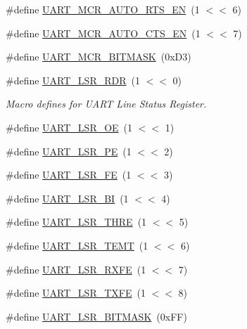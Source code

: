 \begin{DoxyCompactItemize}
\item 
\#define \hyperlink{group__UART__17XX__40XX_gae26cd92b527d6d6ec9f7fd98aeefd94a}{U\-A\-R\-T\-\_\-\-M\-C\-R\-\_\-\-A\-U\-T\-O\-\_\-\-R\-T\-S\-\_\-\-E\-N}~(1 $<$$<$ 6)
\item 
\#define \hyperlink{group__UART__17XX__40XX_ga7769292aa692cb12dce90893fc992d2f}{U\-A\-R\-T\-\_\-\-M\-C\-R\-\_\-\-A\-U\-T\-O\-\_\-\-C\-T\-S\-\_\-\-E\-N}~(1 $<$$<$ 7)
\item 
\#define \hyperlink{group__UART__17XX__40XX_ga0cc006116ea98bd8b00e948073b8d749}{U\-A\-R\-T\-\_\-\-M\-C\-R\-\_\-\-B\-I\-T\-M\-A\-S\-K}~(0x\-D3)
\item 
\#define \hyperlink{group__UART__17XX__40XX_ga3d83de31d722cd373ee69a2a38aaed43}{U\-A\-R\-T\-\_\-\-L\-S\-R\-\_\-\-R\-D\-R}~(1 $<$$<$ 0)
\begin{DoxyCompactList}\small\item\em Macro defines for U\-A\-R\-T Line Status Register. \end{DoxyCompactList}\item 
\#define \hyperlink{group__UART__17XX__40XX_ga85c4312a700f6033bf0a075ae41de57c}{U\-A\-R\-T\-\_\-\-L\-S\-R\-\_\-\-O\-E}~(1 $<$$<$ 1)
\item 
\#define \hyperlink{group__UART__17XX__40XX_ga3ae0ee26be22b855aa08d68a2801d3d2}{U\-A\-R\-T\-\_\-\-L\-S\-R\-\_\-\-P\-E}~(1 $<$$<$ 2)
\item 
\#define \hyperlink{group__UART__17XX__40XX_ga18b1661d7c37ab40c9310311dd4f647d}{U\-A\-R\-T\-\_\-\-L\-S\-R\-\_\-\-F\-E}~(1 $<$$<$ 3)
\item 
\#define \hyperlink{group__UART__17XX__40XX_gaaca4bb43e62c7085534b67576e1ddbeb}{U\-A\-R\-T\-\_\-\-L\-S\-R\-\_\-\-B\-I}~(1 $<$$<$ 4)
\item 
\#define \hyperlink{group__UART__17XX__40XX_gae05118527ef8873b9d7b1b0be0153019}{U\-A\-R\-T\-\_\-\-L\-S\-R\-\_\-\-T\-H\-R\-E}~(1 $<$$<$ 5)
\item 
\#define \hyperlink{group__UART__17XX__40XX_gadb3f8bb82f0a253700fdb88d8c609710}{U\-A\-R\-T\-\_\-\-L\-S\-R\-\_\-\-T\-E\-M\-T}~(1 $<$$<$ 6)
\item 
\#define \hyperlink{group__UART__17XX__40XX_ga5972ac77db6249142b482356427dcf7c}{U\-A\-R\-T\-\_\-\-L\-S\-R\-\_\-\-R\-X\-F\-E}~(1 $<$$<$ 7)
\item 
\#define \hyperlink{group__UART__17XX__40XX_ga1abf066d0f8b3400880a1909373cf699}{U\-A\-R\-T\-\_\-\-L\-S\-R\-\_\-\-T\-X\-F\-E}~(1 $<$$<$ 8)
\item 
\#define \hyperlink{group__UART__17XX__40XX_ga3643d58e12f1d3bf342d140a5e3cb1ae}{U\-A\-R\-T\-\_\-\-L\-S\-R\-\_\-\-B\-I\-T\-M\-A\-S\-K}~(0x\-F\-F)
$$
\end{DoxyCompactItemize}
